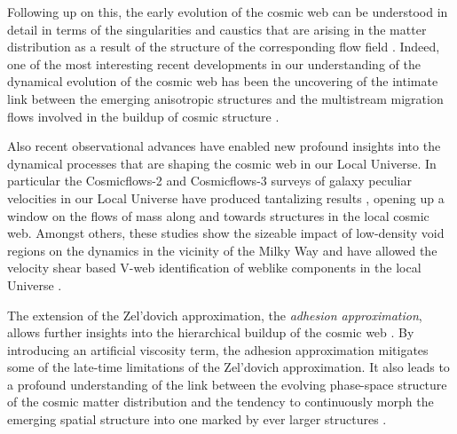 Following up on this, the early evolution of the cosmic web can be understood in detail in terms of the singularities and caustics that 
are arising in the matter distribution as a result of the structure of the corresponding flow field \citep[see][]{Shandarin1989,Hidding2014}. 
Indeed, one of the most interesting recent developments in our understanding of the dynamical evolution of the cosmic web has been the 
uncovering of the intimate link between the emerging anisotropic structures and the multistream migration flows involved in the buildup of 
cosmic structure \citep[][]{Shandarin2011,Shandarin2012,Falck2012,Abel2012}. 

Also recent observational advances have enabled new 
profound insights into the dynamical processes that are shaping the cosmic web in our Local Universe. In particular the Cosmicflows-2 and 
Cosmicflows-3 surveys of galaxy peculiar velocities in our Local Universe have produced tantalizing results \citep{Courtois2013,Tully2014}, opening up a window on the flows of mass along and towards structures in the local cosmic web. Amongst others, these studies show 
the sizeable impact of low-density void regions on the dynamics in the vicinity of the Milky Way and have allowed 
the velocity shear based V-web identification of weblike components in the local Universe \citep{Hoffman2017}. 

The extension of the Zel'dovich approximation, the \emph{adhesion approximation}, allows further insights into the hierarchical buildup 
of the cosmic web \citep{Gurbatov1989,Kofman1992,Hidding2012}. By introducing an artificial viscosity term, the adhesion 
approximation mitigates some of the late-time limitations of the Zel'dovich approximation. It also leads to a profound understanding 
of the link between the evolving phase-space structure of the cosmic matter distribution and the tendency to continuously morph the 
emerging spatial structure into one marked by ever larger structures \citep[see also][for a review of analytical extensions to the Zel'dovich approximation]{1995PhR...262....1S}. 

